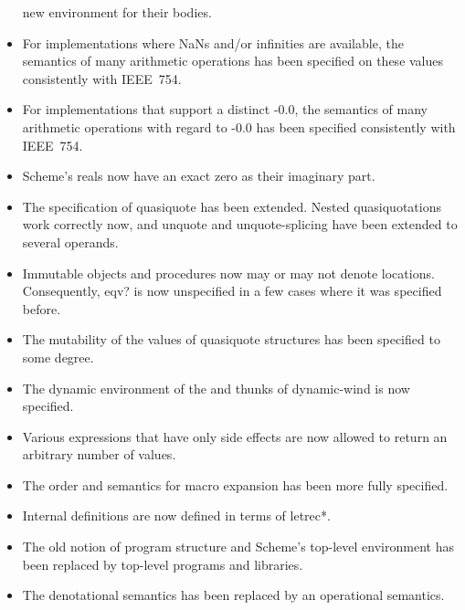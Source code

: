 \begin{itemize}
  new environment for their bodies.
\item For implementations where NaNs and/or infinities are available,
  the semantics of many arithmetic operations has been specified on
  these values consistently with IEEE~754.
\item For implementations that support a distinct -0.0, the semantics
  of many arithmetic operations with regard to -0.0 has been specified
  consistently with IEEE~754.
\item Scheme's reals now have an exact zero as their imaginary part.
\item The specification of {\cf quasiquote} has been extended.  Nested
  quasiquotations work correctly now, and {\cf unquote} and {\cf
    unquote-splicing} have been extended to several operands.
\item Immutable objects and procedures now may or may not denote
  locations.  Consequently, {\cf eqv?} is now unspecified in a few
  cases where it was specified before.
\item The mutability of the values of {\cf quasiquote} structures has
  been specified to some degree.
\item The dynamic environment of the  and 
  thunks of {\cf dynamic-wind} is now specified.
\item Various expressions that have only side effects are now allowed
  to return an arbitrary number of values.
\item The order and semantics for macro expansion has been more fully
  specified.
\item Internal definitions are now defined in terms of {\cf letrec*}.
\item The old notion of program structure and Scheme's top-level
  environment has been replaced by top-level programs and libraries.
\item The denotational semantics has been replaced by an operational
  semantics.
\end{itemize}

